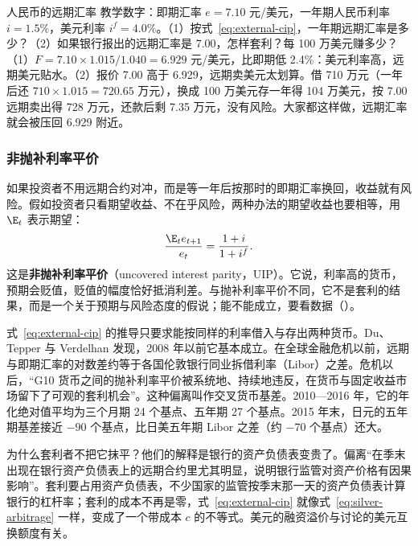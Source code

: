 \begin{example}{人民币的远期汇率}\label{ex:external-cip}
教学数字：即期汇率 $e=7.10$ 元/美元，一年期人民币利率 $i=1.5\%$，美元利率 $i^{f}=4.0\%$。（1）按式~\eqref{eq:external-cip}，一年期远期汇率是多少？（2）如果银行报出的远期汇率是 7.00，怎样套利？每 100 万美元赚多少？
\solution （1）$F=7.10\times1.015/1.040=6.929$ 元/美元，比即期低 2.4\%：美元利率高，远期美元贴水。（2）报价 7.00 高于 6.929，远期卖美元太划算。借 710 万元（一年后还 $710\times1.015=720.65$ 万元），换成 100 万美元存一年得 104 万美元，按 7.00 远期卖出得 728 万元，还款后剩 7.35 万元，没有风险。大家都这样做，远期汇率就会被压回 6.929 附近。
\end{example}

\subsubsection{非抛补利率平价}
如果投资者不用远期合约对冲，而是等一年后按那时的即期汇率换回，收益就有风险。假如投资者只看期望收益、不在乎风险，两种办法的期望收益也要相等，用 $\E_t$ 表示期望：
\begin{equation}
\frac{\E_t e_{t+1}}{e_t}=\frac{1+i}{1+i^{f}} .\label{eq:external-uip}
\end{equation}
这是\textbf{非抛补利率平价}（uncovered interest parity，UIP）。它说，利率高的货币，预期会贬值，贬值的幅度恰好抵消利差。与抛补利率平价不同，它不是套利的结果，而是一个关于预期与风险态度的假说；能不能成立，要看数据（）。

\begin{deeper}[2008 年以后的抛补利率平价]
式~\eqref{eq:external-cip} 的推导只要求能按同样的利率借入与存出两种货币。Du、Tepper 与 Verdelhan 发现，2008 年以前它基本成立。在全球金融危机以前，远期与即期汇率的对数差约等于各国伦敦银行同业拆借利率（Libor）之差\cite{du2018}。危机以后，“G10 货币之间的抛补利率平价被系统地、持续地违反，在货币与固定收益市场留下了可观的套利机会”。这种偏离叫作交叉货币基差。2010—2016 年，它的年化绝对值平均为三个月期 24 个基点、五年期 27 个基点。2015 年末，日元的五年期基差接近 $-90$ 个基点，比日美五年期 Libor 之差（约 $-70$ 个基点）还大\cite{du2018}。

为什么套利者不把它抹平？他们的解释是银行的资产负债表变贵了。偏离“在季末出现在银行资产负债表上的远期合约里尤其明显，说明银行监管对资产价格有因果影响”\cite{du2018}。套利要占用资产负债表，不少国家的监管按季末那一天的资产负债表计算银行的杠杆率；套利的成本不再是零，式~\eqref{eq:external-cip} 就像式~\eqref{eq:silver-arbitrage} 一样，变成了一个带成本 $c$ 的不等式。美元的融资溢价与讨论的美元互换额度有关。
\end{deeper}

